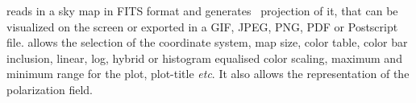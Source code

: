 
{\thedocid{} reads in a \healpix sky map in FITS format and generates
\projfullname \ projection of it, that can be visualized on the screen or
exported in a GIF, JPEG, PNG, PDF or Postscript file. \thedocid{}  allows the selection of
the coordinate system, map size, color table, color bar inclusion,
linear, log, hybrid or histogram equalised color scaling, 
maximum and 
minimum range for the plot, plot-title {\it etc}. It also allows the representation of the
polarization field.}
